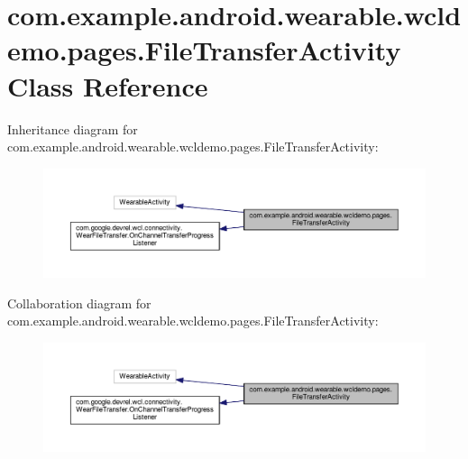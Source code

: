 \hypertarget{classcom_1_1example_1_1android_1_1wearable_1_1wcldemo_1_1pages_1_1FileTransferActivity}{}\section{com.\+example.\+android.\+wearable.\+wcldemo.\+pages.\+File\+Transfer\+Activity Class Reference}
\label{classcom_1_1example_1_1android_1_1wearable_1_1wcldemo_1_1pages_1_1FileTransferActivity}


Inheritance diagram for com.\+example.\+android.\+wearable.\+wcldemo.\+pages.\+File\+Transfer\+Activity\+:\nopagebreak
\begin{figure}[H]
\begin{center}
\leavevmode
\includegraphics[width=350pt]{d9/d98/classcom_1_1example_1_1android_1_1wearable_1_1wcldemo_1_1pages_1_1FileTransferActivity__inherit__graph}
\end{center}
\end{figure}


Collaboration diagram for com.\+example.\+android.\+wearable.\+wcldemo.\+pages.\+File\+Transfer\+Activity\+:\nopagebreak
\begin{figure}[H]
\begin{center}
\leavevmode
\includegraphics[width=350pt]{d0/d4d/classcom_1_1example_1_1android_1_1wearable_1_1wcldemo_1_1pages_1_1FileTransferActivity__coll__graph}
\end{center}
\end{figure}

